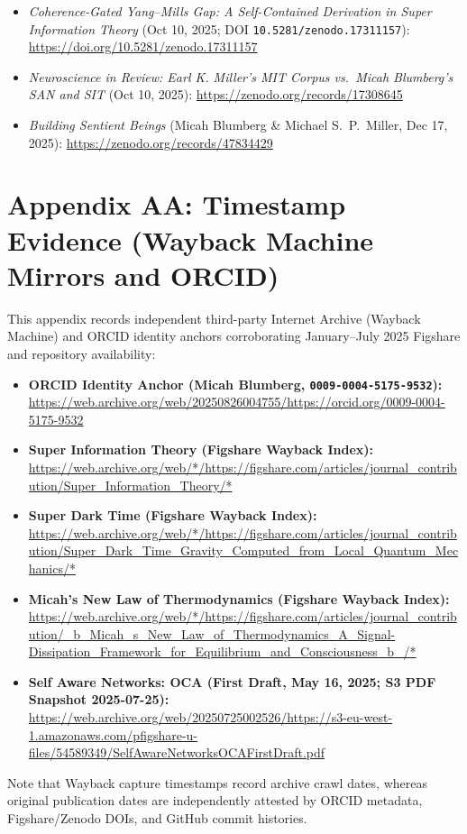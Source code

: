 \begin{itemize}
  \item \emph{Coherence-Gated Yang--Mills Gap: A Self-Contained Derivation in Super Information Theory} (Oct 10, 2025; DOI \texttt{10.\allowbreak{}5281/zenodo.\allowbreak{}17311157}): \url{https://doi.org/10.5281/zenodo.17311157}
  \item \emph{Neuroscience in Review: Earl K. Miller's MIT Corpus vs.\ Micah Blumberg's SAN and SIT} (Oct 10, 2025): \url{https://zenodo.org/records/17308645}
  \item \emph{Building Sentient Beings} (Micah Blumberg \& Michael S.\ P.\ Miller, Dec 17, 2025): \url{https://zenodo.org/records/47834429}
\end{itemize}

\setcounter{subsection}{0}
\renewcommand{\thesection}{AA}
\renewcommand{\thesubsection}{AA.\arabic{subsection}}
\section*{Appendix AA: Timestamp Evidence (Wayback Machine Mirrors and ORCID)}
\label{app:timestamp-aa}

This appendix records independent third-party Internet Archive (Wayback Machine) and ORCID identity anchors corroborating January--July 2025 Figshare and repository availability:
\begin{itemize}
  \item \textbf{ORCID Identity Anchor (Micah Blumberg, \texttt{0009-0004-5175-9532}):} \url{https://web.archive.org/web/20250826004755/https://orcid.org/0009-0004-5175-9532}
  \item \textbf{Super Information Theory (Figshare Wayback Index):} \url{https://web.archive.org/web/*/https://figshare.com/articles/journal_contribution/Super_Information_Theory/*}
  \item \textbf{Super Dark Time (Figshare Wayback Index):} \url{https://web.archive.org/web/*/https://figshare.com/articles/journal_contribution/Super_Dark_Time_Gravity_Computed_from_Local_Quantum_Mechanics/*}
  \item \textbf{Micah's New Law of Thermodynamics (Figshare Wayback Index):} \url{https://web.archive.org/web/*/https://figshare.com/articles/journal_contribution/_b_Micah_s_New_Law_of_Thermodynamics_A_Signal-Dissipation_Framework_for_Equilibrium_and_Consciousness_b_/*}
  \item \textbf{Self Aware Networks: OCA (First Draft, May 16, 2025; S3 PDF Snapshot 2025-07-25):} \url{https://web.archive.org/web/20250725002526/https://s3-eu-west-1.amazonaws.com/pfigshare-u-files/54589349/SelfAwareNetworksOCAFirstDraft.pdf}
\end{itemize}
Note that Wayback capture timestamps record archive crawl dates, whereas original publication dates are independently attested by ORCID metadata, Figshare/Zenodo DOIs, and GitHub commit histories.
